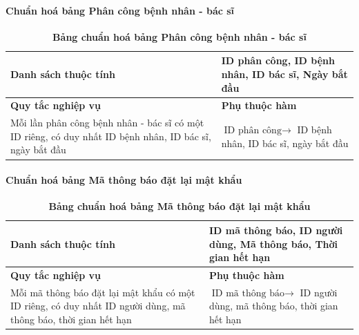 \paragraph{Chuẩn hoá bảng Phân công bệnh nhân - bác sĩ}
\mbox{}

\begin{table}[H]
  \caption{\bfseries \fontsize{12pt}{0pt}\selectfont Bảng chuẩn hoá bảng Phân công bệnh nhân - bác sĩ}
  \centering
  \begin{tabularx}{0.9\textwidth}{|X|X|}
    \hline
    \textbf{Danh sách thuộc tính} & ID phân công, ID bệnh nhân, ID bác sĩ, Ngày bắt
    đầu \\ %
    \hline
    \textbf{Quy tắc nghiệp vụ} & \textbf{Phụ thuộc hàm} \\
    \hline
    Mỗi lần phân công bệnh nhân - bác sĩ có một ID riêng, có duy nhất ID bệnh nhân, ID bác sĩ, ngày bắt
    đầu & \parbox[t]{\linewidth}{$\text{ID phân công} \rightarrow$ ID bệnh nhân, ID bác sĩ, ngày bắt
    đầu} \\
    \hline
     \\
     \\
    \hline
  \end{tabularx}
\end{table}




\paragraph{Chuẩn hoá bảng Mã thông báo đặt lại mật khẩu}
\mbox{}

\begin{table}[H]
  \caption{\bfseries \fontsize{12pt}{0pt}\selectfont Bảng chuẩn hoá bảng Mã thông báo đặt lại mật khẩu}
  \centering
  \begin{tabularx}{0.9\textwidth}{|X|X|}
    \hline
    \textbf{Danh sách thuộc tính} & ID mã thông báo, ID người dùng, Mã thông báo,
    Thời gian hết hạn \\ %
    \hline
    \textbf{Quy tắc nghiệp vụ} & \textbf{Phụ thuộc hàm} \\
    \hline
    Mỗi mã thông báo đặt lại mật khẩu có một ID riêng, có duy nhất ID người dùng, mã thông báo,
    thời gian hết hạn & \parbox[t]{\linewidth}{$\text{ID mã thông báo} \rightarrow$ ID người dùng, mã thông báo,
    thời gian hết hạn} \\
    \hline
     \\
     \\
    \hline
  \end{tabularx}
\end{table}


